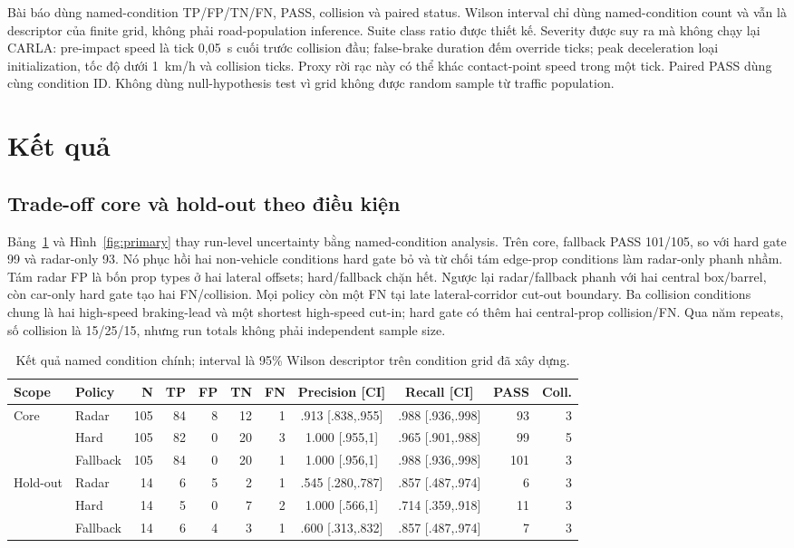 \documentclass[conference]{IEEEtran}
\begin{document}
Bài báo dùng named-condition TP/FP/TN/FN, PASS, collision và paired status.
Wilson interval chỉ dùng named-condition count và vẫn là descriptor của finite
grid, không phải road-population inference. Suite class ratio được thiết kế.
Severity được suy ra mà không chạy lại CARLA: pre-impact speed là tick 0,05~s cuối
trước collision đầu; false-brake duration đếm override ticks; peak deceleration
loại initialization, tốc độ dưới 1~km/h và collision ticks. Proxy rời rạc này có
thể khác contact-point speed trong một tick. Paired PASS dùng cùng condition ID.
Không dùng null-hypothesis test vì grid không được random sample từ traffic
population.

\section{Kết quả}
\subsection{Trade-off core và hold-out theo điều kiện}
Bảng~\ref{tab:primary} và Hình~\ref{fig:primary} thay run-level uncertainty bằng
named-condition analysis. Trên core, fallback PASS 101/105, so với hard gate 99
và radar-only 93. Nó phục hồi hai non-vehicle conditions hard gate bỏ và từ chối
tám edge-prop conditions làm radar-only phanh nhầm. Tám radar FP là bốn prop types
ở hai lateral offsets; hard/fallback chặn hết. Ngược lại radar/fallback phanh với
hai central box/barrel, còn car-only hard gate tạo hai FN/collision. Mọi policy
còn một FN tại late lateral-corridor cut-out boundary. Ba collision conditions
chung là hai high-speed braking-lead và một shortest high-speed cut-in; hard gate
có thêm hai central-prop collision/FN. Qua năm repeats, số collision là 15/25/15,
nhưng run totals không phải independent sample size.

\begin{table}[t]
\caption{Kết quả named condition chính; interval là 95\% Wilson descriptor trên condition grid đã xây dựng.}
\label{tab:primary}
\centering\scriptsize
\setlength{\tabcolsep}{3pt}
\begin{tabular}{llrrrrrccrr}
\toprule Scope & Policy & N & TP & FP & TN & FN & Precision [CI] & Recall [CI] & PASS & Coll.\\
\midrule
Core & Radar & 105 & 84 & 8 & 12 & 1 & .913 [.838,.955] & .988 [.936,.998] & 93 & 3\\
 & Hard & 105 & 82 & 0 & 20 & 3 & 1.000 [.955,1] & .965 [.901,.988] & 99 & 5\\
 & Fallback & 105 & 84 & 0 & 20 & 1 & 1.000 [.956,1] & .988 [.936,.998] & 101 & 3\\
\midrule
Hold-out & Radar & 14 & 6 & 5 & 2 & 1 & .545 [.280,.787] & .857 [.487,.974] & 6 & 3\\
 & Hard & 14 & 5 & 0 & 7 & 2 & 1.000 [.566,1] & .714 [.359,.918] & 11 & 3\\
 & Fallback & 14 & 6 & 4 & 3 & 1 & .600 [.313,.832] & .857 [.487,.974] & 7 & 3\\
\bottomrule
\end{tabular}
\end{table}
\end{document}
